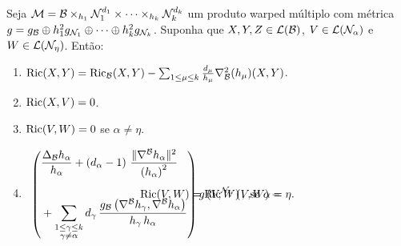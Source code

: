 \begin{lema}\label{TensorRicciDoWarped}
Seja $\mathcal{M} = \mathcal{B} \times_{h_1} \mathcal{N}_1^{d_1} \times \cdots \times_{h_k} \mathcal{N}_{k}^{d_k}$ um produto warped múltiplo com métrica $g = g_{\mathcal{B}} \oplus h_1^2 g_{\mathcal{N}_1} \oplus \cdots \oplus h_{k}^2 g_{\mathcal{N}_k}$. Suponha que $X, Y, Z \in \mathcal{L}(\mathcal{B})$, $V \in \mathcal{L}(\mathcal{N}_{\alpha})$ e $W \in \mathcal{L}(\mathcal{N}_{\eta})$. Então:
\begin{enumerate}[label=\color{blue}\normalfont\textbf{(\theenumi)}]
\item\label{RicXY} $\mathrm{Ric}(X, Y) = \mathrm{Ric}_{\mathcal{B}}(X, Y) - \sum_{1 \leq \mu \leq k} \frac{d_{\mu}}{h_{\mu}} \nabla^2_{\mathcal{B}}(h_{\mu})(X, Y)$.
\item\label{RicXV} $\mathrm{Ric}(X, V) = 0$.
\item\label{RicVWd} $\mathrm{Ric}(V, W) = 0$ se $\alpha \neq \eta$.
\item\label{RicVWi} \[
 \Ric(V, W) = \Ric^{\nn_{\alpha}}\parent{ V, W } -
\begin{split}\hspace{-7.9cm}
    \left(
    \begin{aligned}
          &\frac{\Delta_{\bb} h_{\alpha}}{h_{\alpha}} + \parent{d_{\alpha} - 1} \, \frac{\| \cn^{\bb} h_{\alpha} \|^2}{\parent{h_{\alpha}}^2} \\[0.5cm]
         &+ \sum_{\substack{1 \leq \gamma \leq k \\
\gamma \neq \alpha}} d_{\gamma} \, \frac{g_{\bb} \parent{ \cn^{\bb} h_{\gamma}, \cn^{\bb} h_{\alpha} }}{h_{\gamma} \, h_{\alpha}}
    \end{aligned}
    \right) g\parent{ V, W }, \text{ se } \alpha = \eta.
\end{split}
\]
\end{enumerate}

\end{lema}

